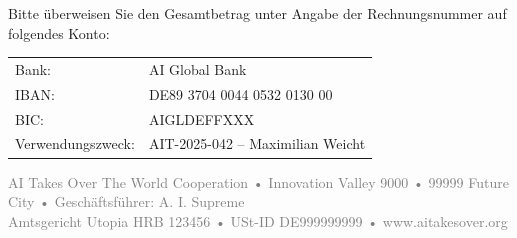 \documentclass[a4paper,12pt]{article}
\begin{document}
\vspace{0.5cm}
\noindent
Bitte überweisen Sie den Gesamtbetrag unter Angabe der Rechnungsnummer auf folgendes Konto:

\vspace{0.3cm}
\begin{tabular}{ll}
Bank: & AI Global Bank \\
IBAN: & DE89 3704 0044 0532 0130 00 \\
BIC: & AIGLDEFFXXX \\
Verwendungszweck: & AIT-2025-042 – Maximilian Weicht
\end{tabular}

\vfill
\begin{center}
\textcolor{gray}{
\scriptsize AI Takes Over The World Cooperation • Innovation Valley 9000 • 99999 Future City • Geschäftsführer: A. I. Supreme \\
Amtsgericht Utopia HRB 123456 • USt-ID DE999999999 • www.aitakesover.org
}
\end{center}
\end{document}
